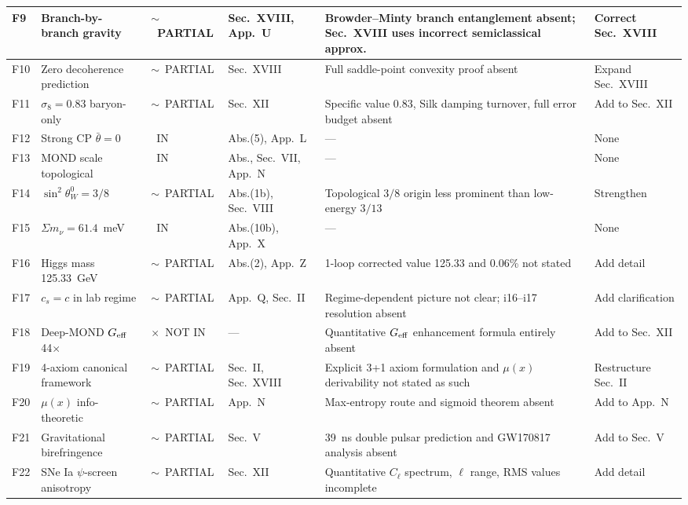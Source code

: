 \documentclass[11pt,a4paper]{article}
\newcommand{\vin}{\textcolor{statusIN}{\checkmark~IN}}
\newcommand{\vpartial}{\textcolor{statusPARTIAL}{$\sim$~PARTIAL}}
\newcommand{\vnot}{\textcolor{statusNOT}{$\times$~NOT IN}}
\begin{document}
{\begin{longtable}{|p{0.5cm}|p{4.8cm}|p{1.6cm}|p{2.5cm}|p{4.5cm}|p{1.8cm}|}
\rowcolor{major!8}
F9 & Branch-by-branch gravity & \vpartial & Sec.~XVIII, App.~U & Browder--Minty branch entanglement absent; Sec.~XVIII uses incorrect semiclassical approx. & Correct Sec.~XVIII \\
\hline
\rowcolor{major!8}
F10 & Zero decoherence prediction & \vpartial & Sec.~XVIII & Full saddle-point convexity proof absent & Expand Sec.~XVIII \\
\hline
\rowcolor{major!8}
F11 & $\sigma_8 = 0.83$ baryon-only & \vpartial & Sec.~XII & Specific value 0.83, Silk damping turnover, full error budget absent & Add to Sec.~XII \\
\hline
\rowcolor{major!8}
F12 & Strong CP $\bar{\theta} = 0$ & \vin & Abs.(5), App.~L & --- & None \\
\hline
\rowcolor{major!8}
F13 & MOND scale topological & \vin & Abs., Sec.~VII, App.~N & --- & None \\
\hline
\rowcolor{major!8}
F14 & $\sin^2\theta_W^0 = 3/8$ & \vpartial & Abs.(1b), Sec.~VIII & Topological $3/8$ origin less prominent than low-energy $3/13$ & Strengthen \\
\hline
\rowcolor{major!8}
F15 & $\Sigma m_\nu = 61.4$~meV & \vin & Abs.(10b), App.~X & --- & None \\
\hline
\rowcolor{major!8}
F16 & Higgs mass 125.33~GeV & \vpartial & Abs.(2), App.~Z & 1-loop corrected value 125.33 and 0.06\% not stated & Add detail \\
\hline
\rowcolor{major!8}
F17 & $c_s = c$ in lab regime & \vpartial & App.~Q, Sec.~II & Regime-dependent picture not clear; i16--i17 resolution absent & Add clarification \\
\hline
\rowcolor{major!8}
F18 & Deep-MOND $G_{\rm eff}$ 44$\times$ & \vnot & --- & Quantitative $G_{\rm eff}$ enhancement formula entirely absent & Add to Sec.~XII \\
\hline
\rowcolor{major!8}
F19 & 4-axiom canonical framework & \vpartial & Sec.~II, Sec.~XVIII & Explicit 3+1 axiom formulation and $\mu(x)$ derivability not stated as such & Restructure Sec.~II \\
\hline
\rowcolor{major!8}
F20 & $\mu(x)$ info-theoretic & \vpartial & App.~N & Max-entropy route and sigmoid theorem absent & Add to App.~N \\
\hline
\rowcolor{major!8}
F21 & Gravitational birefringence & \vpartial & Sec.~V & 39~ns double pulsar prediction and GW170817 analysis absent & Add to Sec.~V \\
\hline
\rowcolor{major!8}
F22 & SNe Ia $\psi$-screen anisotropy & \vpartial & Sec.~XII & Quantitative $C_\ell$ spectrum, $\ell$ range, RMS values incomplete & Add detail \\

\end{longtable}}
\end{document}
